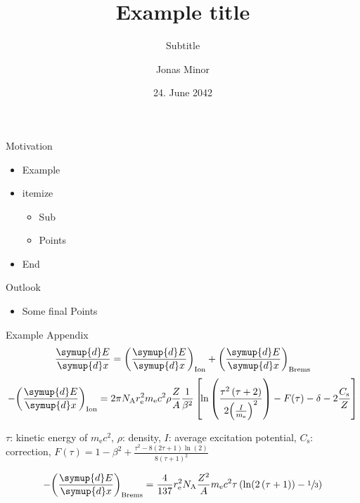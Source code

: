 \documentclass[aspectratio=1610, 17pt]{beamer}
\title{Example title} %
\subtitle{Subtitle} %
\author[J.~Minor]{Jonas Minor} %
\date{24. June 2042} %
\institute[]{Simulation Sciences} %
\newcommand{\dd}{\symup{d}}
\begin{document}
\maketitle

\begin{frame}{Motivation}
  \begin{itemize}
    \item Example
    \item itemize 
          \begin{itemize}
            \item Sub
            \item Points
          \end{itemize}
    \item End
  \end{itemize}
\end{frame}

\begin{frame}{Outlook}
  \begin{itemize}
        \item Some final Points
  \end{itemize}
  \vspace{0cm}
\end{frame}

\begin{frame}
  \centering
  \Huge{}
\end{frame}

\printappxnotes

\begin{frame}{Example Appendix}
  \vspace{-1ex}
  \small
  \begin{equation*}
    \frac{\dd E}{\dd x} = {\left(\frac{\dd E}{\dd x}\right)}_\text{Ion} + {\left(\frac{\dd E}{\dd x}\right)}_\text{Brems}
  \end{equation*}
  \begin{equation*}
    - {\left(\frac{\dd E}{\dd x}\right)}_\text{Ion} = 2 \pi N_\text{A} r_\text{e}^2 m_\text{e} c^2 \rho \frac{Z}{A} \frac{1}{\beta^2} \left[ \!\ln \left(\frac{\tau^2 \left(\tau + 2\right)}{2 {\left(\frac{I}{m_\text{e}}\right)}^2}\right) - F \!\left(\tau\right) - \delta - 2\frac{C_\text{s}}{Z} \right]
  \end{equation*}
  \begin{center}
    \vspace{-0em}
    \footnotesize
    $\tau$: kinetic energy of $m_\text{e} c^2$, $\rho$: density, $I$: average excitation potential, $C_\text{s}$: correction, $F(\tau) = 1 - \beta^2 + \frac{\tau^2 - 8 \left(2 \tau + 1\right) \ln \left(2\right)}{8 {\left(\tau + 1\right)}^2}$
  \end{center}
  \begin{equation*}
    - {\left(\frac{\dd E}{\dd x}\right)}_\text{Brems} = \frac{4}{137} r_\text{e}^2 N_\text{A} \frac{Z^2}{A} m_\text{e} c^2 \tau \left(\ln \!\left(2 \left(\tau + 1\right)\right) - \sfrac{1}{3}\right)
  \end{equation*}
\end{frame}
\end{document}
